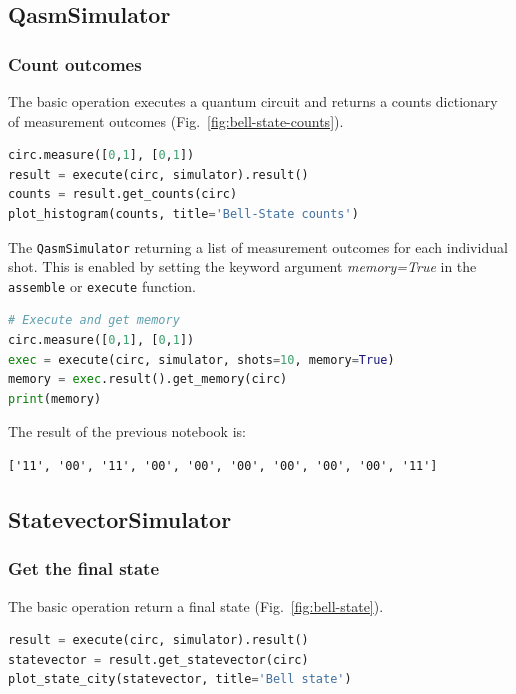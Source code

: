 \documentclass[a4paper,num-refs]{oup-contemporary}
\begin{document}
\subsection{QasmSimulator}

\subsubsection{Count outcomes}
The basic operation executes a quantum circuit and returns a counts dictionary of measurement outcomes (Fig.~\ref{fig:bell-state-counts}).
\begin{lstlisting}[language=Python]
circ.measure([0,1], [0,1])
result = execute(circ, simulator).result()
counts = result.get_counts(circ)
plot_histogram(counts, title='Bell-State counts') 
\end{lstlisting}


The \verb|QasmSimulator| returning a list of measurement outcomes for each individual shot. This is enabled by setting the keyword argument \textit{memory=True} in the \verb|assemble| or \verb|execute| function.

\begin{lstlisting}[language=Python]
# Execute and get memory
circ.measure([0,1], [0,1])
exec = execute(circ, simulator, shots=10, memory=True)
memory = exec.result().get_memory(circ)
print(memory)
\end{lstlisting}

The result of the previous notebook is:
\begin{verbatim}
['11', '00', '11', '00', '00', '00', '00', '00', '00', '11']
\end{verbatim}

\subsection{StatevectorSimulator}

\subsubsection{Get the final state}

The basic operation return a final state (Fig.~\ref{fig:bell-state}).

\begin{lstlisting}[language=Python]
result = execute(circ, simulator).result()
statevector = result.get_statevector(circ)
plot_state_city(statevector, title='Bell state')
\end{lstlisting}
\end{document}
